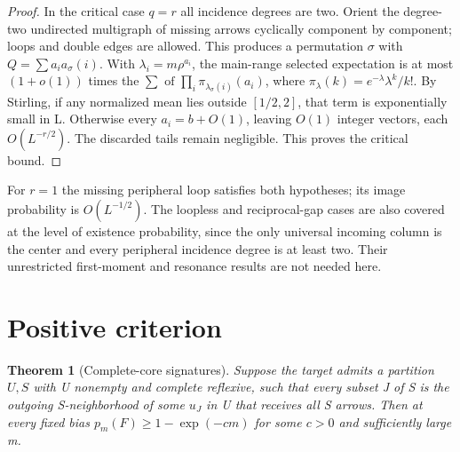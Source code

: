 \documentclass[11pt]{article}
\newtheorem{theorem}{Theorem}
\begin{document}
\begin{proof}
In the critical case $q=r$ all incidence degrees are two. Orient the degree-two undirected multigraph of missing arrows cyclically component by component; loops and double edges are allowed. This produces a permutation $\sigma $ with $Q=\sum  a_{i} a_{\sigma }(i)$. With $\lambda _{i}=m \rho ^{a_{i}}$, the main-range selected expectation is at most $(1+o(1))$ times the $\sum  \text{ of } \prod _{i} \pi _{\lambda _{\sigma }(i)}(a_{i})$, where $\pi _{\lambda }(k)=e^{-\lambda }\lambda ^{k}/k!$. By Stirling, if any normalized mean lies outside $[1/2,2]$, that term is exponentially small in L. Otherwise every $a_{i}=b+O(1)$, leaving $O(1)$ integer vectors, each $O(L^{-r/2})$. The discarded tails remain negligible. This proves the critical bound.
\end{proof}

For $r=1$ the missing peripheral loop satisfies both hypotheses; its image probability is $O(L^{-1/2})$. The loopless and reciprocal-gap cases are also covered at the level of existence probability, since the only universal incoming column is the center and every peripheral incidence degree is at least two. Their unrestricted first-moment and resonance results are not needed here.

\section{Positive criterion}

\begin{theorem}[Complete-core signatures]\label{thm:core} Suppose the target admits a partition $U,S$ with U nonempty and complete reflexive, such that every subset J of S is the outgoing S-neighborhood of some $u_{J}$ in U that receives all S arrows. Then at every fixed bias $p_{m}(F)\geq 1-\exp (-c m)$ for some $c>0$ and sufficiently large m.

\end{theorem}
\end{document}
